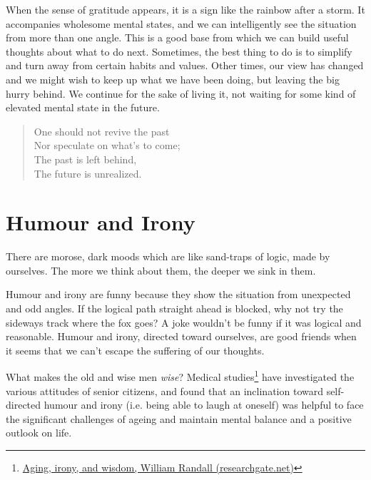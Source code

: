 When the sense of gratitude appears, it is a sign like the rainbow after
a storm. It accompanies wholesome mental states, and we can
intelligently see the situation from more than one angle. This is a good
base from which we can build useful thoughts about what to do next.
Sometimes, the best thing to do is to simplify and turn away from
certain habits and values. Other times, our view has changed and we
might wish to keep up what we have been doing, but leaving the big hurry
behind. We continue for the sake of living it, not waiting for some kind
of elevated mental state in the future.

\begin{quote}
One should not revive the past\\
Nor speculate on what's to come;\\
The past is left behind,\\
The future is unrealized.

\bigskip

\end{quote}

\section{Humour and Irony}


\noindent There are morose, dark moods which are like sand-traps of
logic, made by ourselves. The more we think about them, the deeper we
sink in them.

Humour and irony are funny because they show the situation from
unexpected and odd angles. If the logical path straight ahead is
blocked, why not try the sideways track where the fox goes? A joke
wouldn't be funny if it was logical and reasonable. Humour and irony,
directed toward ourselves, are good friends when it seems that we can't
escape the suffering of our thoughts.

What makes the old and wise men \emph{wise}? Medical studies\footnote{\href{https://www.researchgate.net/publication/258190619_Aging_irony_and_wisdom_On_the_narrative_psychology_of_later_life}{Aging,
  irony, and wisdom, William Randall (researchgate.net)}} have
investigated the various attitudes of senior citizens, and found that an
inclination toward self-directed humour and irony (i.e. being able to
laugh at oneself) was helpful to face the significant challenges of
ageing and maintain mental balance and a positive outlook on life.

